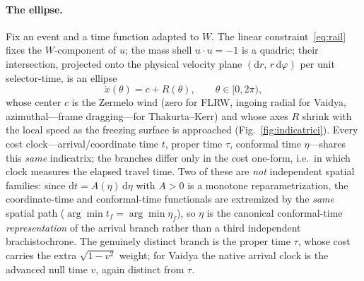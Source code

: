 \documentclass[12pt]{iopart}
\newcommand{\dd}{\mathrm{d}}
\begin{document}
\paragraph{The ellipse.} Fix an event and a time function adapted to $W$. The
linear constraint~\eqref{eq:rail} fixes the $W$-component of $u$; the mass shell
$u\cdot u=-1$ is a quadric; their intersection, projected onto the physical
velocity plane $(\dd r,\,r\,\dd\varphi)$ per unit selector-time, is an ellipse
\begin{equation}
    \dot x(\theta)=c+R(\theta),\qquad \theta\in[0,2\pi),
    \label{eq:ellipse}
\end{equation}
whose center $c$ is the Zermelo wind (zero for FLRW, ingoing radial for Vaidya,
azimuthal---frame dragging---for Thakurta--Kerr) and whose axes $R$ shrink with
the local speed as the freezing surface is approached (Fig.~\ref{fig:indicatrici}).
Every cost clock---arrival/coordinate time $t$, proper time $\tau$, conformal time
$\eta$---shares this \emph{same} indicatrix; the branches differ only in the cost
one-form, i.e.\ in which clock measures the elapsed travel time. Two of these are
\emph{not} independent spatial families: since $\dd t=A(\eta)\,\dd\eta$ with $A>0$ is
a monotone reparametrization, the coordinate-time and conformal-time functionals are
extremized by the \emph{same} spatial path ($\arg\min t_f=\arg\min\eta_f$), so $\eta$
is the canonical conformal-time \emph{representation} of the arrival branch rather
than a third independent brachistochrone. The genuinely distinct branch is the proper
time $\tau$, whose cost carries the extra $\sqrt{1-v^2}$ weight; for Vaidya the native
arrival clock is the advanced null time $v$, again distinct from $\tau$.
\end{document}
